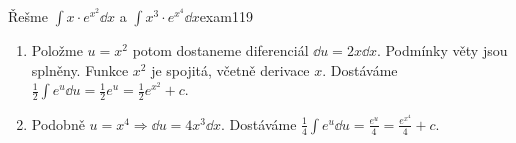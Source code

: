 \begin{mathexam}{Řešme \(\int x\cdot e^{x^2}\dd{x}\) a \(\int x^3\cdot e^{x^4}\dd{x}\)}{exam119}
    \begin{enumerate}[label=\alph*)]
      \item Položme \(u=x^2\) potom dostaneme diferenciál \(\dd{u}=2x\dd{x}\). Podmínky věty jsou
            splněny. Funkce \(x^2\) je spojitá, včetně derivace \(x\). Dostáváme
            \(\frac{1}{2}\int{e^u\dd{u}}=\frac{1}{2}e^u=\frac{1}{2}e^{x^2} + c\). 
      \item Podobně \(u=x^4 \Rightarrow \dd{u}=4x^3\dd{x}\). Dostáváme 
            \(\frac{1}{4}\int{e^u}\dd{u} = \frac{e^u}{4} = \frac{e^{x^4}}{4} + c \).
    \end{enumerate}
\end{mathexam}